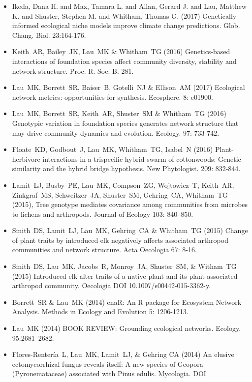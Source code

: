\documentclass[a4paper]{article}
\begin{document}
\begin{itemize}
\item  
  Ikeda, Dana H. and Max, Tamara L. and Allan, Gerard J. and Lau,
  Matthew K. and Shuster, Stephen M. and Whitham, Thomas G. (2017)
  Genetically informed ecological niche models improve climate change
  predictions. Glob. Chang. Biol. 23:164-176.
\item 
  Keith~AR, Bailey~JK, Lau~MK \& Whitham~TG (2016) Genetics-based
  interactions of foundation species affect community diversity,
  stability and network structure. Proc. R. Soc. B. 281.
\item  
  Lau~MK, Borrett~SR, Baiser~B, Gotelli~NJ \& Ellison~AM (2017)
  Ecological network metrics: opportunities for
  synthesis. Ecosphere. 8: e01900.
\item
  Lau~MK, Borrett~SR, Keith~AR, Shuster~SM \& Whitham~TG (2016)
  Genotypic variation in foundation species generates network
  structure that may drive community dynamics and
  evolution. Ecology. 97: 733-742.
\item
  Floate~KD, Godbout~J, Lau~MK, Whitham~TG, Isabel~N (2016)
  Plant-herbivore interactions in a trispecific hybrid swarm of
  cottonwoods: Genetic similarity and the hybrid bridge
  hypothesis. New Phytologist. 209: 832-844.
\item 
  Lamit~LJ, Busby~PE, Lau~MK, Compson~ZG, Wojtowicz~T, Keith~AR,
  Zinkgraf~MS, Schweitzer~JA, Shuster~SM, Gehring~CA, Whitham~TG
  (2015), Tree genotype mediates covariance among communities from
  microbes to lichens and arthropods. Journal of Ecology 103: 840–850.
\item
  Smith~DS, Lamit~LJ, Lau~MK, Gehring~CA \& Whitham~TG (2015) Change
  of plant traits by introduced elk negatively affects associated
  arthropod communities and network structure. Acta Oecologia 67: 8-16. 
\item 
  Smith~DS, Lau~MK, Jacobs~R, Monroy~JA, Shuster~SM, \& Witham~TG (2015)
  Introduced elk alter traits of a native plant and its plant-associated
  arthropod community. Oecologia DOI 10.1007/s00442-015-3362-y.
\item
  Borrett~SR \& Lau~MK (2014) enaR: An R package for Ecosystem Network
  Analysis. Methods in Ecology and Evolution 5: 1206-1213.
\item
  Lau~MK (2014) BOOK REVIEW: Grounding ecological networks. Ecology.
  95:2681--2682.
\item
  Flores-Rentería~L, Lau~MK, Lamit~LJ, \& Gehring CA (2014) An elusive
  ectomycorrhizal fungus reveals itself: A new species of Geopora
  (Pyronemataceae) associated with Pinus edulis. Mycologia. DOI

\end{itemize}
\end{document}

